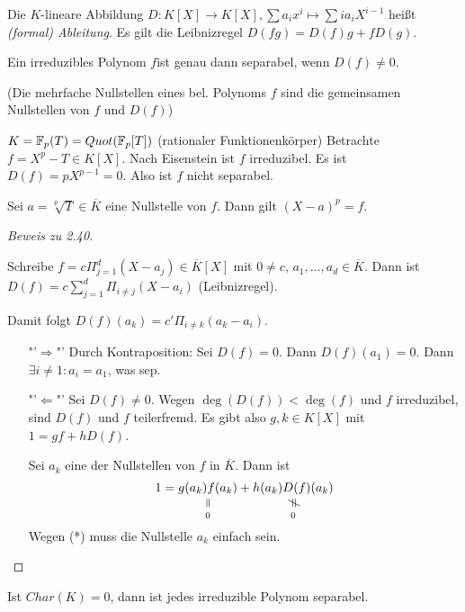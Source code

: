 \documentclass[../main.tex]{subfiles}
\begin{document}
\begin{definition}
    Die $K$-lineare Abbildung $D:K[X]\rightarrow K[X], \sum a_ix^i \mapsto \sum ia_iX^{i-1}$ heißt \emph{(formal) Ableitung}.
    Es gilt die Leibnizregel $D(fg) = D(f)g+fD(g)$.
\end{definition}
\begin{theorem}
    Ein irreduzibles Polynom $f$ist genau dann separabel, wenn $D(f)\neq 0$.
\end{theorem}
(Die mehrfache Nullstellen eines bel. Polynoms $f$ sind die gemeinsamen Nullstellen von $f$ und $D(f)$)
\begin{example}
    $K = \mathbb{F}_p(T) = Quot(\mathbb{F}_p[T])$ (rationaler Funktionenkörper)
    Betrachte $f=X^p-T\in K[X]$.
    Nach Eisenstein ist $f$ irreduzibel.
    Es ist $D(f)=pX^{p-1} = 0$.
    Also ist $f$ nicht separabel.
    
    Sei $a=\sqrt[p]{T}\in \overline{K}$ eine Nullstelle von $f$.
    Dann gilt $(X-a)^p =f$.
\end{example}
\begin{proof}[Beweis zu 2.40]
    \begin{remark*}
        Schreibe $f=c\Pi_{j=1}^d (X-a_j)\in \overline{K}[X]$ mit $0\neq c$, $a_1,\dots, a_d\in \overline{K}$.
        Dann ist $D(f) = c\sum_{j=1}^d \Pi_{i\neq j} (X-a_i)$ (Leibnizregel).
    \end{remark*}
    Damit folgt $D(f)(a_k)=c'\Pi_{i\neq k} (a_k-a_i)$.

    \begin{itemize}
        \item["'$\Rightarrow$"'] Durch Kontraposition: Sei $D(f)=0$. Dann $D(f)(a_1)=0$. Dann $\exists i\neq1: a_i=a_1$, was \Lightning sep.
        \item["'$\Leftarrow$"'] Sei $D(f)\neq 0$.
        Wegen $\deg(D(f)) < \deg(f)$ und $f$ irreduzibel, sind $D(f)$ und $f$ teilerfremd.
        Es gibt also $g,k\in K[X]$ mit $1=gf+hD(f)$.
    
        Sei $a_k$ eine der Nullstellen von $f$ in $\overline{K}$. Dann ist
        $$1=\equalto{g(a_k) f(a_k)}{0} + \notequalto{h(a_k) D(f)(a_k)}{ 0}$$
        Wegen (*) muss die Nullstelle $a_k$ einfach sein.
    \end{itemize}
\end{proof}

\begin{remark}
    Ist $Char(K)=0$, dann ist jedes irreduzible Polynom separabel.
\end{remark}
\end{document}
